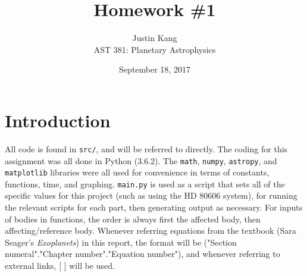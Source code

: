 \documentclass[12pt]{article}
\title{\vspace{-3em} \textbf{Homework \#1}}
\author{Justin Kang \\ AST 381: Planetary Astrophysics}
\date{September 18, 2017}
\begin{document}
\maketitle


\section*{Introduction}
All code is found in \texttt{src/}, and will be referred to directly. The coding for this assignment was all done in Python (3.6.2). The \texttt{math}, \texttt{numpy}, \texttt{astropy}, and \texttt{matplotlib} libraries were all used for convenience in terms of constants, functions, time, and graphing. \texttt{main.py} is used as a script that sets all of the specific values for this project (such as using the HD 80606 system), for running the relevant scripts for each part, then generating output as necessary. For inputs of bodies in functions, the order is always first the affected body, then affecting/reference body. Whenever referring equations from the textbook (Sara Seager's \textit{Exoplanets}) in this report, the format will be ("Section numeral"."Chapter number"."Equation number"), and whenever referring to external links, [ ] will be used.
\end{document}
